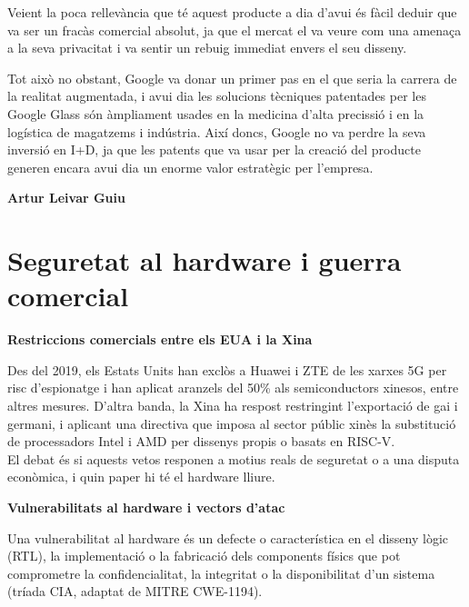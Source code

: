 \documentclass[catalan, a4paper]{article}
\begin{document}
\vspace{1em}

Veient la poca rellevància que té aquest producte a dia d'avui és fàcil deduir que va ser un fracàs comercial
absolut, ja que el mercat el va veure com una amenaça a la seva privacitat i va sentir un rebuig immediat envers
el seu disseny.

\vspace{1em}

Tot això no obstant, Google va donar un primer pas en el que seria la carrera de la realitat augmentada, i avui
dia les solucions tècniques patentades per les Google Glass són àmpliament usades en la medicina d'alta precissió
i en la logística de magatzems i indústria. Així doncs, Google no va perdre la seva inversió en I+D, ja que les
patents que va usar per la creació del producte generen encara avui dia un enorme valor estratègic per l'empresa.

\clearpage

{\bfseries\color{accent} Artur Leivar Guiu \par}\vspace{-0.4cm}
\section{Seguretat al hardware i guerra comercial}

\textbf{Restriccions comercials entre els EUA i la Xina}

Des del 2019, els Estats Units han exclòs a Huawei i ZTE de les xarxes 5G per risc d'espionatge i
han aplicat aranzels del 50\% als semiconductors xinesos, entre altres mesures.
D'altra banda, la Xina ha respost restringint l'exportació de ga\lgem{}i i germani, i aplicant
una directiva que imposa al sector públic xinès la substitució de processadors Intel i AMD per
dissenys propis o basats en RISC-V. \\
El debat és si aquests vetos responen a motius reals de seguretat o a una disputa econòmica, i quin
paper hi té el hardware lliure.

\textbf{Vulnerabilitats al hardware i vectors d'atac}


Una vulnerabilitat al hardware és un defecte o característica en el disseny lògic (RTL),
la implementació o la fabricació dels components físics que pot comprometre la confidencialitat,
la integritat o la disponibilitat d'un sistema (tríada CIA, adaptat de MITRE CWE-1194).
\end{document}
